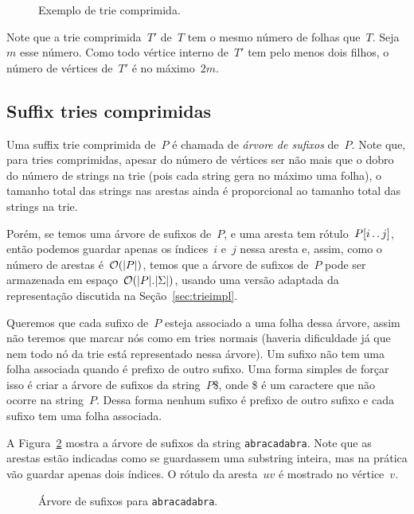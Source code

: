 \begin{figure}
\centering
{}
\caption{Exemplo de trie comprimida.}
\label{fig:triecomp}
\end{figure}

Note que a trie comprimida~$T'$ de~$T$ tem o mesmo número de folhas que~$T$. Seja~$m$ esse número. Como todo vértice interno de~$T'$ tem pelo menos dois filhos, o número de vértices de~$T'$ é no máximo~$2m$. %

\subsection{Suffix tries comprimidas}

Uma suffix trie comprimida de~$P$ é chamada de \emph{árvore de sufixos} de~$P$. Note que, para tries comprimidas, apesar do número de vértices ser não mais que o dobro do número de strings na trie (pois cada string gera no máximo uma folha), o tamanho total das strings nas arestas ainda é proporcional ao tamanho total das strings na trie.

Porém, se temos uma árvore de sufixos de~$P$, e uma aresta tem rótulo~$P[i\,.\,.\, j]$, então podemos guardar apenas os índices~$i$ e~$j$ nessa aresta e, assim, como o número de arestas é~$\mathcal{O}(|P|)$, temos que a árvore de sufixos de~$P$ pode ser armazenada em espaço~$\mathcal{O}(|P|.|\Sigma|)$, usando uma versão adaptada da representação discutida na Seção~\ref{sec:trieimpl}.

Queremos que cada sufixo de~$P$ esteja associado a uma folha dessa árvore, assim não teremos que marcar nós como em tries normais (haveria dificuldade já que nem todo nó da trie está representado nessa árvore). Um sufixo não tem uma folha associada quando é prefixo de outro sufixo. Uma forma simples de forçar isso é criar a árvore de sufixos da string~$P$\$, onde \$ é um caractere que não ocorre na string~$P$. Dessa forma nenhum sufixo é prefixo de outro sufixo e cada sufixo tem uma folha associada.

A Figura~\ref{fig:suftreesimple} mostra a árvore de sufixos da string \texttt{abracadabra}. Note que as arestas estão indicadas como se guardassem uma substring inteira, mas na prática vão guardar apenas dois índices. O rótulo da aresta~$uv$ é mostrado no vértice~$v$.

\begin{figure}[h]
\centering
{}
\caption{Árvore de sufixos para \texttt{abracadabra}.}
\label{fig:suftreesimple}
\end{figure}

